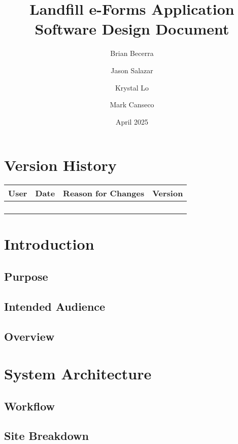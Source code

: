 \documentclass[12pt]{article}
\title{Landfill e-Forms Application\\
Software Design Document}
\author{
    Brian Becerra\\
    \and
    Jason Salazar\\
    \and
    Krystal Lo\\
    \and
    Mark Canseco\\
    }
\date{April 2025}
\begin{document}
\begin{titlepage}
\maketitle
\thispagestyle{empty}
\end{titlepage}

\thispagestyle{empty}
\tableofcontents
\newpage

\section*{Version History}
\begin{table}[ht]
    \centering
    \begin{tabular}{|c|c|c|c|}
    \hline
    \textbf{User} & \textbf{Date} & \textbf{Reason for Changes} & \textbf{Version}\\
    \hline
         &  &  & \\
    \hline
         &  &  & \\
    \hline
         &  &  & \\
    \hline
         &  &  & \\
    \hline
    \end{tabular}
\end{table}
\newpage

\section{Introduction}
\subsection{Purpose}
\subsection{Intended Audience}
\subsection{Overview}
\newpage

\section{System Architecture}
\subsection{Workflow}
\subsection{Site Breakdown}
\newpage
\end{document}
